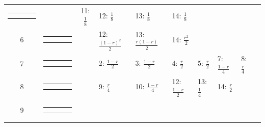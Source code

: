 \documentclass[9pt,letterpaper,twoside]{article}
\begin{document}
{\begin{center}
\begin{tabular}{ccclllllll}
{\renewcommand{\arraystretch}{0.3}
\renewcommand{\tabcolsep}{0.5mm}
\parbox[b][3mm][c]{12mm}{
\begin{tabular}{|p{2mm}|p{2mm}||p{2mm}|p{2mm}|} \hline
$\bullet$ &           & $\circ  $ &           \\
          & $\bullet$ &           & $\circ  $ \\ \hline
\end{tabular}}}
&
& 11: $\frac{1}{8}$
& 12: $\frac{1}{8}$
& 13: $\frac{1}{8}$
& 14: $\frac{1}{8}$
& & & \\
6 &
{\renewcommand{\arraystretch}{0.3}
\renewcommand{\tabcolsep}{0.5mm}
\parbox[b][3mm][c]{12mm}{
\begin{tabular}{|p{2mm}|p{2mm}||p{2mm}|p{2mm}|} \hline
$\bullet$ & $\circ  $ &           &           \\
$\circ  $ & $\bullet$ &           &           \\ \hline
\end{tabular}}}
&
& 12: $\frac{(1-r)^2}{2}$
& 13: $\frac{r(1-r)}{2}$
& 14: $\frac{r^2}{2}$
& & & & \\
7 &
{\renewcommand{\arraystretch}{0.3}
\renewcommand{\tabcolsep}{0.5mm}
\parbox[b][3mm][c]{12mm}{
\begin{tabular}{|p{2mm}|p{2mm}||p{2mm}|p{2mm}|} \hline
$\bullet$ & $\circ  $ &           &           \\
$\bullet$ &           & $\circ  $ &           \\ \hline
\end{tabular}}}
&
& 2: $\frac{1-r}{2}$
& 3: $\frac{1-r}{2}$
& 4: $\frac{r}{2}$
& 5: $\frac{r}{2}$
& 7: $\frac{1-r}{4}$
& 8: $\frac{r}{4}$
& \\
8 &
{\renewcommand{\arraystretch}{0.3}
\renewcommand{\tabcolsep}{0.5mm}
\parbox[b][3mm][c]{12mm}{
\begin{tabular}{|p{2mm}|p{2mm}||p{2mm}|p{2mm}|} \hline
$\bullet$ &           & $\circ  $ &           \\
$\circ  $ & $\bullet$ &           &           \\ \hline
\end{tabular}}}
&
& 9: $\frac{r}{4}$
& 10: $\frac{1-r}{4}$
& 12: $\frac{1-r}{2}$
& 13: $\frac{1}{4}$
& 14: $\frac{r}{2}$
& & \\
9 &
{\renewcommand{\arraystretch}{0.3}
\renewcommand{\tabcolsep}{0.5mm}
\parbox[b][3mm][c]{12mm}{
\begin{tabular}{|p{2mm}|p{2mm}||p{2mm}|p{2mm}|} \hline
$\bullet$ & $\circ  $ &           &           \\
          & $\circ  $ & $\bullet$ &           \\ \hline

\end{tabular}}}
\end{tabular}
\end{center}}
\end{document}
